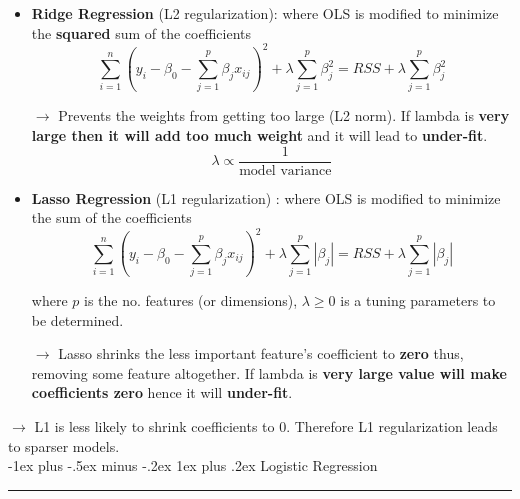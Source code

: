 \documentclass[letterpaper, 10.5pt,landscape]{article}
\makeatletter
\renewcommand{\subsubsection}{\@startsection{subsubsection}{3}{0mm}%
                                {-1ex plus -.5ex minus -.2ex}%
                                {1ex plus .2ex}%
                                {\normalfont\small\bfseries}}
\makeatother
\begin{document}
\begin{multicols*}{3}
\begin{itemize}

     \item \textbf{Ridge Regression} (L2 regularization): where OLS is modified to minimize the \textbf{squared} sum of the coefficients 
     \vspace{-4pt}
    \[ \boxed{\sum^{n}_{i=1} (y_{i} - \beta_{0} - \sum^{p}_{j=1} \beta_{j} x_{ij})^{2} + \lambda \sum^{p}_{j=1} \beta^{2}_{j} = RSS + \lambda \sum^{p}_{j=1} \beta^{2}_{j}} \]
    \vspace{-7pt}
    
   $\rightarrow$ Prevents the weights from getting too large (L2 norm). If lambda is \textbf{very large then it will add too much weight} and it will lead to \textbf{under-fit}.
   \vspace{-5pt}
   \[ \boxed{ \lambda \propto \frac{1} {\text{model variance}}}  \]
    
    \item \textbf{Lasso Regression} (L1 regularization) : where OLS is modified to minimize the sum of the coefficients 
    \vspace{-3pt}
    \[ \boxed{\sum^{n}_{i=1} (y_{i} - \beta_{0} - \sum^{p}_{j=1} \beta_{j} x_{ij})^{2} + \lambda \sum^{p}_{j=1} \left| \beta_{j} \right| = RSS + \lambda \sum^{p}_{j=1} \left| \beta_{j} \right|}  \]
    \vspace{-10pt}
     
    where $p$ is the no. features (or dimensions), $\lambda \geq 0$ is a tuning parameters to be determined. 
    
    \vspace{2pt}
    
   $\rightarrow$ Lasso shrinks the less important feature’s coefficient to \textbf{zero} thus, removing some feature altogether. If lambda is \textbf{very large value will make coefficients zero} hence it will \textbf{under-fit}.
   \vspace{-3pt}
\end{itemize}

$\rightarrow$ L1 is less likely to shrink coefficients to 0. Therefore L1 regularization leads to sparser models. \\







\subsubsection{Logistic Regression} {\color{teal}\hrule height 0.5pt} \smallskip




\end{multicols*}
\end{document}

